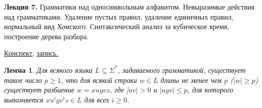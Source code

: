\documentclass[a4paper]{article}
\newcommand{\mybox}{%
    \collectbox{%
        \setlength{\fboxsep}{1pt}%
        \fbox{\BOXCONTENT}%
    }%
}
\theoremstyle{indented}
\newtheorem{lemma}{Лемма}
\theoremstyle{definition}
\theoremstyle{remark}
\begin{document}
\textbf{Лекция 7.} Грамматики над односимвольным алфавитом. Невыразимые действия над грамматиками. Удаление пустых правил, удаление единичных правил, нормальный вид Хомского. Синтаксический анализ за кубическое время, построение дерева разбора.

\begin{flushright}
    \mybox{
        \href{https://users.math-cs.spbu.ru/~okhotin/teaching/tcs_fl_2021/okhotin_tcs_fl_2021_l7.pdf}{Конспект,}
        \href{https://disk.yandex.ru/d/knoQ44wLmGDwwQ/2021-2022%20учебный%20год%20(осенний%20семестр)/2%20курс/Теоретическая%20информатика/M2021-10-13_111709_1h40m_102.mp4}{запись.}
    }
\end{flushright}



\begin{lemma}
    Для всякого языка $L \subseteq \Sigma^*$, задаваемого грамматикой, существует такое число $p \geq 1$, что для всякой строки $w \in L$ длины не менее чем $p$ ($|w| \geq p$) существует разбиение $w = xuyvz$, где |$uv| > 0$ и $|uyv| \leq p$, для которого выполняется $xu^iyv^iz \in L$ для всех $i \geq 0$.
\end{lemma}
\end{document}
